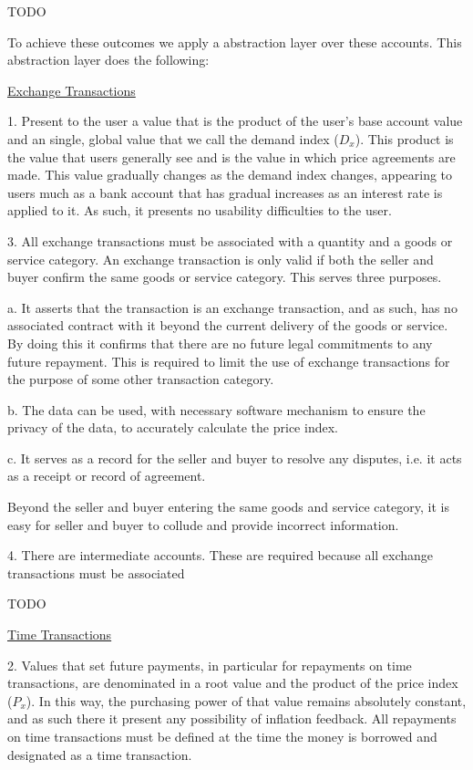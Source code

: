TODO

To achieve these outcomes we apply a abstraction layer over these accounts. This abstraction layer
does the following:

\underline{Exchange Transactions}

1. Present to the user a value that is the product of the user's base account value and an single,
global value that we call the demand index ($D_x$). This product is the value that users generally
see and is the value in which price agreements are made. This value gradually changes as the demand
index changes, appearing to users much as a bank account that has gradual increases as an interest
rate is applied to it. As such, it presents no usability difficulties to the user.

3. All exchange transactions must be associated with a quantity and a goods or service category. An
exchange transaction is only valid if both the seller and buyer confirm the same goods or service
category. This serves three purposes.

a. It asserts that the transaction is an exchange transaction, and as such, has no associated
contract with it beyond the current delivery of the goods or service. By doing this it confirms that
there are no future legal commitments to any future repayment. This is required to limit the use of
exchange transactions for the purpose of some other transaction category.

b. The data can be used, with necessary software mechanism to ensure the privacy of the data, to
accurately calculate the price index. 

c. It serves as a record for the seller and buyer to resolve any disputes, i.e. it acts as a
receipt or record of agreement.

Beyond the seller and buyer entering the same goods and service category, it is easy for seller and
buyer to collude and provide incorrect information.

4. There are intermediate accounts. These are required because all exchange transactions must be
associated

TODO

\underline{Time Transactions}

2. Values that set future payments, in particular for repayments on time transactions, are
denominated in a root value and the product of the price index ($P_x$). In this way, the purchasing
power of that value remains absolutely constant, and as such there it present any possibility of
inflation feedback. All repayments on time transactions must be defined at the time the money is
borrowed and designated as a time transaction.

